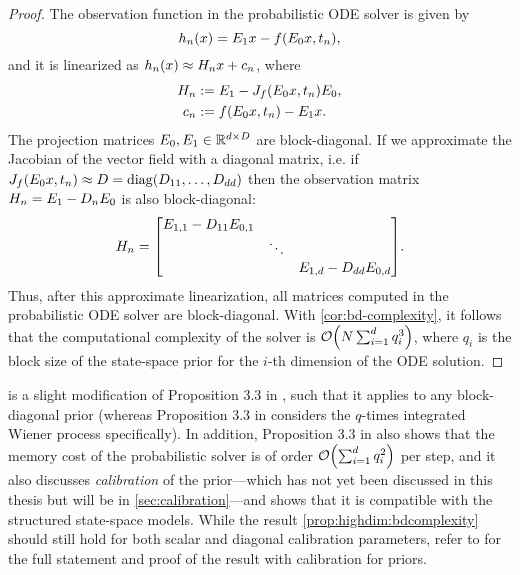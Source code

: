 \documentclass{mimosis}
\begin{document}
\begin{proof}
The observation function in the probabilistic ODE solver is given by
\begin{equation}
  \obsh_\idxt(\st) = \proj{1} \st - \vf( \proj{0} \st, t_\idxt),
\end{equation}
and it is linearized as \(h_n(x) \approx H_n x + c_n\),
where
\begin{subequations}
\begin{align}
  \obsA_\idxt &:= \proj{1} - \jac{\vf}(\proj{0} \st, t_\idxt) \proj{0}, \\
  \obsb_\idxt &:= \vf( \proj{0} \st, t_\idxt) - \proj{1} \st.
\end{align}
\end{subequations}
The projection matrices \(E_{0}, E_{1} \in \mathbb{R}^{d \times D}\) are block-diagonal.
If we approximate the Jacobian of the vector field with a diagonal matrix, i.e. if \(\jac{\vf}(\proj{0} \st, t_\idxt) \approx D = \diag(D_{11}, \dots, D_{dd})\)
then the observation matrix
\(H_n = E_{1} - D_n E_{0}\)
is also block-diagonal:
\begin{equation}
  \obsA_\idxt = \mqty[\dmat{ \proj{1,1} - D_{11} \proj{0,1}, \ddots, \proj{1,d} - D_{dd} \proj{0,d} }].
\end{equation}
Thus, after this approximate linearization, all matrices computed in the probabilistic ODE solver are block-diagonal.
With \cref{cor:bd-complexity}, it follows that the computational complexity of the solver is \(\order{N \sum_{i=1}^d q_i^3}\),
where \(q_i\) is the block size of the state-space prior for the \(i\)-th dimension of the ODE solution.
\end{proof}

is a slight modification
of Proposition 3.3 in \highdim{},
such that it applies to any block-diagonal prior
(whereas Proposition 3.3 in \highdim{} considers the \(q\)-times integrated Wiener process specifically).
In addition,
Proposition 3.3 in \highdim{}
also shows that the memory cost of the probabilistic solver is of order
\(\order{\sum_{i=1}^d q_i^2}\) per step,
and it also discusses \emph{calibration} of the prior---which has not yet been discussed in this thesis but will be in \cref{sec:calibration}---and shows that it is compatible with the structured state-space models.
While the result \cref{prop:highdim:bdcomplexity} should still hold for both scalar and diagonal calibration parameters, refer to \highdim{} for the full statement and proof of the result with calibration for  priors.
\end{document}
